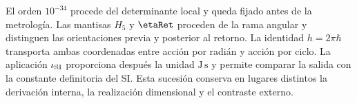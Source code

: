 \begin{statusbox}[title={Jerarquía probatoria de la constante de Planck}]
El orden \(10^{-34}\) procede del determinante local y queda fijado antes de
la metrología. Las mantisas \(H_5\) y \(\etaRet\) proceden de la rama angular
y distinguen las orientaciones previa y posterior al retorno. La identidad
\(h=2\pi\hbar\) transporta ambas coordenadas entre acción por radián y acción
por ciclo. La aplicación \(\iota_{\rm SI}\) proporciona después la unidad
\(\mathrm{J\,s}\) y permite comparar la salida con la constante definitoria
del SI. Esta sucesión conserva en lugares distintos la derivación interna,
la realización dimensional y el contraste externo.
\end{statusbox}
